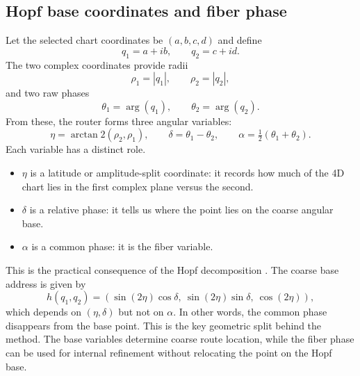 \documentclass[10pt,letterpaper]{article}
\begin{document}
\subsection{Hopf base coordinates and fiber phase}
Let the selected chart coordinates be $(a,b,c,d)$ and define
\begin{equation}
q_1 = a + ib, \qquad q_2 = c + id.
\end{equation}
The two complex coordinates provide radii
\begin{equation}
\rho_1 = |q_1|, \qquad \rho_2 = |q_2|,
\end{equation}
and two raw phases
\begin{equation}
\theta_1 = \arg(q_1), \qquad \theta_2 = \arg(q_2).
\end{equation}
From these, the router forms three angular variables:
\begin{equation}
\eta = \arctan2(\rho_2,\rho_1), \qquad
\delta = \theta_1 - \theta_2, \qquad
\alpha = \tfrac{1}{2}(\theta_1+\theta_2).
\label{eq:hopfcoords}
\end{equation}
Each variable has a distinct role.
\begin{itemize}
\item $\eta$ is a latitude or amplitude-split coordinate: it records how much of the 4D chart lies in the first complex plane versus the second.
\item $\delta$ is a relative phase: it tells us where the point lies on the coarse angular base.
\item $\alpha$ is a common phase: it is the fiber variable.
\end{itemize}

This is the practical consequence of the Hopf decomposition \citep{hopfibration}. The coarse base address is given by
\begin{equation}
h(q_1,q_2) = \left(\sin(2\eta)\cos\delta,\ \sin(2\eta)\sin\delta,\ \cos(2\eta)\right),
\label{eq:hopfmap}
\end{equation}
which depends on $(\eta,\delta)$ but not on $\alpha$. In other words, the common phase disappears from the base point. This is the key geometric split behind the method. The base variables determine coarse route location, while the fiber phase can be used for internal refinement without relocating the point on the Hopf base.
\end{document}
